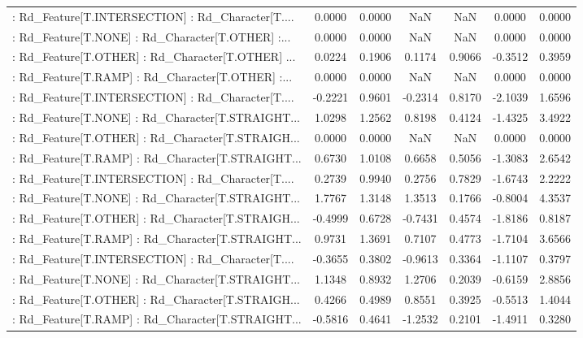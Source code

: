 \begin{longtable}{p{4cm}cccccc}
 : Rd\_Feature[T.INTERSECTION] : Rd\_Character[T.... &  0.0000 &    0.0000 &     NaN &          NaN &  0.0000 &  0.0000 \\
 : Rd\_Feature[T.NONE] : Rd\_Character[T.OTHER] :... &  0.0000 &    0.0000 &     NaN &          NaN &  0.0000 &  0.0000 \\
 : Rd\_Feature[T.OTHER] : Rd\_Character[T.OTHER] ... &  0.0224 &    0.1906 &  0.1174 &       0.9066 & -0.3512 &  0.3959 \\
 : Rd\_Feature[T.RAMP] : Rd\_Character[T.OTHER] :... &  0.0000 &    0.0000 &     NaN &          NaN &  0.0000 &  0.0000 \\
 : Rd\_Feature[T.INTERSECTION] : Rd\_Character[T.... & -0.2221 &    0.9601 & -0.2314 &       0.8170 & -2.1039 &  1.6596 \\
 : Rd\_Feature[T.NONE] : Rd\_Character[T.STRAIGHT... &  1.0298 &    1.2562 &  0.8198 &       0.4124 & -1.4325 &  3.4922 \\
 : Rd\_Feature[T.OTHER] : Rd\_Character[T.STRAIGH... &  0.0000 &    0.0000 &     NaN &          NaN &  0.0000 &  0.0000 \\
 : Rd\_Feature[T.RAMP] : Rd\_Character[T.STRAIGHT... &  0.6730 &    1.0108 &  0.6658 &       0.5056 & -1.3083 &  2.6542 \\
 : Rd\_Feature[T.INTERSECTION] : Rd\_Character[T.... &  0.2739 &    0.9940 &  0.2756 &       0.7829 & -1.6743 &  2.2222 \\
 : Rd\_Feature[T.NONE] : Rd\_Character[T.STRAIGHT... &  1.7767 &    1.3148 &  1.3513 &       0.1766 & -0.8004 &  4.3537 \\
 : Rd\_Feature[T.OTHER] : Rd\_Character[T.STRAIGH... & -0.4999 &    0.6728 & -0.7431 &       0.4574 & -1.8186 &  0.8187 \\
 : Rd\_Feature[T.RAMP] : Rd\_Character[T.STRAIGHT... &  0.9731 &    1.3691 &  0.7107 &       0.4773 & -1.7104 &  3.6566 \\
 : Rd\_Feature[T.INTERSECTION] : Rd\_Character[T.... & -0.3655 &    0.3802 & -0.9613 &       0.3364 & -1.1107 &  0.3797 \\
 : Rd\_Feature[T.NONE] : Rd\_Character[T.STRAIGHT... &  1.1348 &    0.8932 &  1.2706 &       0.2039 & -0.6159 &  2.8856 \\
 : Rd\_Feature[T.OTHER] : Rd\_Character[T.STRAIGH... &  0.4266 &    0.4989 &  0.8551 &       0.3925 & -0.5513 &  1.4044 \\
 : Rd\_Feature[T.RAMP] : Rd\_Character[T.STRAIGHT... & -0.5816 &    0.4641 & -1.2532 &       0.2101 & -1.4911 &  0.3280 \\

\end{longtable}
